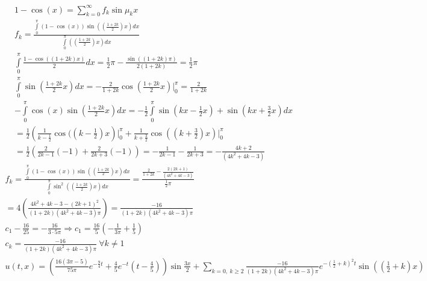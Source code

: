 	\begin{gather*}
		1 - \cos(x) = \sum\limits_{k = 0}^{\infty} f_{k} \sin \mu_{k} x\\
		f_{k} = \frac{\int\limits_{0}^{\pi} (1 - \cos(x)) \sin \left(\left(\frac{1+2k}{2}\right)x\right)dx}{\int\limits_{0}^{\pi} \left(\left(\frac{1+2k}{2}\right)x\right)dx}\\
		\int\limits_{0}^{\pi} \frac{1 - \cos((1+2k)x)}{2}dx
		= \frac{1}{2} \pi - \frac{\sin((1+2k)\pi)}{2(1+2k)} = \frac{1}{2}\pi\\
		\int\limits_{0}^{\pi} \sin \left(\frac{1+2k}{2}x\right)dx
		= -\frac{2}{1+2k} \cos\left(\frac{1+2k}{2}x\right)\Big|_{0}^{\pi} = \frac{2}{1+2k}\\
		-\int\limits_{0}^{\pi} \cos(x) \sin \left(\frac{1+2k}{2}x\right)dx
		= -\frac{1}{2} \int\limits_{0}^{\pi} \sin(kx - \frac{1}{2}x) + \sin(kx + \frac{3}{2}x)dx\\
		= \frac{1}{2}\left(\frac{1}{k - \frac{1}{2}} \cos((k - \frac{1}{2})x\right)\Big|_{0}^{\pi} + \frac{1}{k + \frac{3}{2}} \cos ((k + \frac{3}{2})x)\Big|_{0}^{\pi}\\
		= \frac{1}{2} \left(\frac{2}{2k-1}(-1) + \frac{2}{2k+3}(-1)\right)
		= -\frac{1}{2k-1} - \frac{1}{2k+3}
		= -\frac{4k+2}{(4k^2 + 4k - 3)}
	\end{gather*}
	\begin{gather*}
		f_{k} = \frac{\int\limits_{0}^{\pi}(1-\cos(x))\sin\left(\left(\frac{1+2k}{2}\right)x\right)dx}{\int\limits_{0}^{\pi} \sin^2 \left(\left(\frac{1+2k}{2}\right)x\right)dx}
		= \frac{\frac{2}{1+2k} - \frac{2(2k+1)}{(4k^2+4k-3)}}{\frac{1}{2}\pi}\\
		= 4\left(\frac{4k^2+4k-3-(2k+1)^2}{(1+2k)(4k^2+4k-3)\pi}\right)
		= \frac{-16}{(1+2k)(4k^2+4k-3)\pi}\\
		c_{1} - \frac{16}{25} = -\frac{16}{3 \cdot 5 \pi} \Rightarrow c_{1} = \frac{16}{5}\left(-\frac{1}{3\pi} + \frac{1}{5}\right)\\
		c_{k} = \frac{-16}{(1+2k)(4k^2+4k-3)\pi}\ \forall k \ne 1\\
		u(t,x) = \left(\frac{16(3\pi - 5)}{75\pi}e^{-\frac{9}{4}t} + \frac{4}{5}e^{-t}(t - \frac{4}{5})\right) \sin \frac{3x}{2} + \sum\limits_{k = 0,\ k \geqslant 2} \frac{-16}{(1+2k)(4k^2+4k-3)\pi} e^{-(\frac{1}{2} + k)^2 t} \sin\left(\left(\frac{1}{2} + k\right)x\right)
	\end{gather*}
\vskip 0.4in

